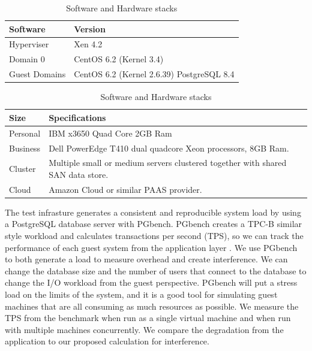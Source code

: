 \begin{table}[h]
\begin{subtable}[h]{0.45\textwidth}
\begin{tabular}{ l p{5cm} }
  Software & Version \\
  \hline
  Hyperviser & Xen 4.2 \\
  Domain 0 & CentOS 6.2 (Kernel 3.4) \\
  Guest Domains & CentOS 6.2 (Kernel 2.6.39) PostgreSQL 8.4 \\
  \hline
\end{tabular}
\caption{Software installed virtualization test stack}
\label{softStack}
\end{subtable}
\hfill
\begin{subtable}[h]{0.45\textwidth}
\begin{tabular}{ l p{5cm} }
  Size & Specifications \\
  \hline
  Personal & IBM x3650 Quad Core 2GB Ram \\
  Business & Dell PowerEdge T410 dual quadcore Xeon processors, 8GB Ram. \\
  Cluster & Multiple small or medium servers clustered together with shared SAN data store. \\
  Cloud & Amazon Cloud or similar PAAS provider. \\
  \hline
\end{tabular}
\caption{Virtualization sizes for tests}
\label{virtSize}
\end{subtable}
\caption{Software and Hardware stacks}
\end{table}

The test infrasture generates a consistent and reproducible system load by using a PostgreSQL database server with PGbench.  
 PGbench creates a TPC-B similar style workload and calculates transactions per second (TPS), so we can track the performance of each guest system from the application layer \cite{pgTune}.  
 We use PGbench to both generate a load to measure overhead and create interference.  
 We can change the database size and the number of users that connect to the database to change the I/O workload from the guest perspective.
PGbench will put a stress load on the limits of the system, and it is a good tool for simulating guest machines that are all consuming as much resources as possible.  
 We measure the TPS from the benchmark when run as a single virtual machine and when run with multiple machines concurrently.  We compare the degradation from the application to our proposed calculation for interference.

